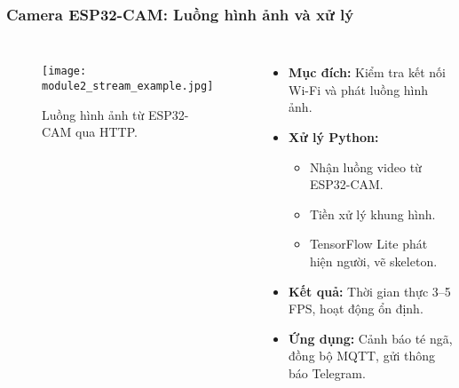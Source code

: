 \begin{frame}[t,fragile]
\frametitle{Camera ESP32-CAM: Luồng hình ảnh và xử lý}
\begin{columns}[T]
    \begin{figure}[H]
        \centering
        \texttt{[image: module2\_stream\_example.jpg]}
        \caption{Luồng hình ảnh từ ESP32-CAM qua HTTP.}
    \end{figure}

    \begin{itemize}
        \item \textbf{Mục đích:} Kiểm tra kết nối Wi-Fi và phát luồng hình ảnh.
        \item \textbf{Xử lý Python:}
        \begin{itemize}
            \item Nhận luồng video từ ESP32-CAM.
            \item Tiền xử lý khung hình.
            \item TensorFlow Lite phát hiện người, vẽ skeleton.
        \end{itemize}
        \item \textbf{Kết quả:} Thời gian thực 3–5 FPS, hoạt động ổn định.
        \item \textbf{Ứng dụng:} Cảnh báo té ngã, đồng bộ MQTT, gửi thông báo Telegram.
    \end{itemize}
\end{columns}
\end{frame}

